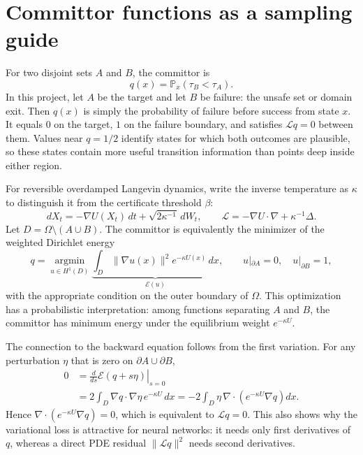 \documentclass[10pt]{extarticle}
\begin{document}
\section{Committor functions as a sampling guide}

For two disjoint sets $A$ and $B$, the committor is
\begin{equation}
  q(x)=\mathbb P_x(\tau_B<\tau_A).
\end{equation}
In this project, let $A$ be the target and let $B$ be failure: the unsafe set or
domain exit.  Then $q(x)$ is simply the probability of failure before success
from state $x$.  It equals $0$ on the target, $1$ on the failure boundary, and
satisfies $\mathcal Lq=0$ between them.  Values near $q=1/2$ identify states for
which both outcomes are plausible, so these states contain more useful
transition information than points deep inside either region.

For reversible overdamped Langevin dynamics, write the inverse temperature as
$\kappa$ to distinguish it from the certificate threshold $\beta$:
\begin{equation}
  dX_t=-\nabla U(X_t)\,dt+\sqrt{2\kappa^{-1}}\,dW_t,
  \qquad
  \mathcal L=-\nabla U\cdot\nabla+\kappa^{-1}\Delta.
\end{equation}
Let $D=\Omega\setminus(A\cup B)$.  The committor is equivalently the minimizer
of the weighted Dirichlet energy
\begin{equation}
  q=\underset{u\in H^1(D)}{\operatorname{argmin}}
  \underbrace{\int_D\lVert\nabla u(x)\rVert^2
  e^{-\kappa U(x)}\,dx}_{\mathcal E(u)},
  \qquad
  u|_{\partial A}=0,\quad u|_{\partial B}=1,
  \label{eq:committor-variational}
\end{equation}
with the appropriate condition on the outer boundary of $\Omega$.  This
optimization has a probabilistic interpretation: among functions separating
$A$ and $B$, the committor has minimum energy under the equilibrium weight
$e^{-\kappa U}$.

The connection to the backward equation follows from the first variation.  For
any perturbation $\eta$ that is zero on $\partial A\cup\partial B$,
\begin{align}
  0
  &=\left.\frac{d}{ds}\mathcal E(q+s\eta)\right|_{s=0}\\
  &=2\int_D \nabla q\cdot\nabla\eta\,e^{-\kappa U}\,dx
   =-2\int_D\eta\,\nabla\!\cdot
   \left(e^{-\kappa U}\nabla q\right)dx.
\end{align}
Hence $\nabla\!\cdot(e^{-\kappa U}\nabla q)=0$, which is equivalent to
$\mathcal Lq=0$.  This also shows why the variational loss is attractive for
neural networks: it needs only first derivatives of $q$, whereas a direct PDE
residual $\lVert\mathcal Lq\rVert^2$ needs second derivatives.
\end{document}
